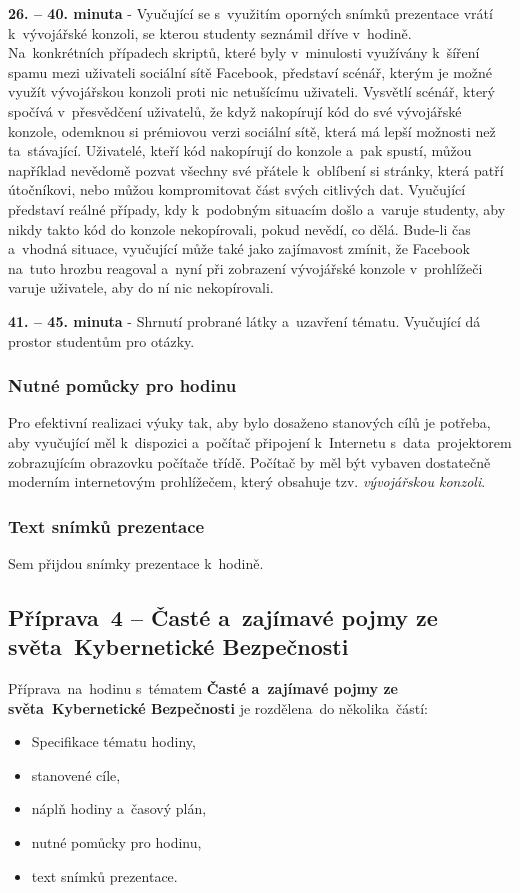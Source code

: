\documentclass[a4paper, 12pt]{article}
\begin{document}
\textbf{26. -- 40. minuta} - Vyučující se s~využitím oporných snímků prezentace vrátí k~vývojářské konzoli, se kterou studenty seznámil dříve v~hodině. Na~konkrétních případech skriptů, které byly v~minulosti využívány k~šíření spamu mezi uživateli sociální sítě Facebook, představí scénář, kterým je možné využít vývojářskou konzoli proti nic netušícímu uživateli. Vysvětlí scénář, který spočívá v~přesvědčení uživatelů, že když nakopírují kód do své vývojářské konzole, odemknou si prémiovou verzi sociální sítě, která má lepší možnosti než ta~stávající. Uživatelé, kteří kód nakopírují do konzole a~pak spustí, můžou například nevědomě pozvat všechny své přátele k~oblíbení si stránky, která patří útočníkovi, nebo můžou kompromitovat část svých citlivých dat. Vyučující představí reálné případy, kdy k~podobným situacím došlo a~varuje studenty, aby nikdy takto kód do konzole nekopírovali, pokud nevědí, co dělá. Bude-li čas a~vhodná situace, vyučující může také jako zajímavost zmínit, že Facebook na~tuto hrozbu reagoval a~nyní při zobrazení vývojářské konzole v~prohlížeči varuje uživatele, aby do ní nic nekopírovali.

\textbf{41. -- 45. minuta} - Shrnutí probrané látky a~uzavření tématu. Vyučující dá prostor studentům pro otázky.

\subsubsection{Nutné pomůcky pro hodinu}
Pro efektivní realizaci výuky tak, aby bylo dosaženo stanových cílů je potřeba, aby vyučující měl k~dispozici a~počítač připojení k~Internetu s~data~projektorem zobrazujícím obrazovku počítače třídě. Počítač by měl být vybaven dostatečně moderním internetovým prohlížečem, který obsahuje tzv. \textit{vývojářskou konzoli}.

\subsubsection{Text snímků prezentace}
Sem přijdou snímky prezentace k~hodině.


\subsection{Příprava~4 -- Časté a~zajímavé pojmy ze světa~Kybernetické Bezpečnosti}
Příprava~na~hodinu s~tématem \textbf{Časté a~zajímavé pojmy ze světa~Kybernetické Bezpečnosti} je rozdělena~do několika~částí:
\begin{itemize}
        \setlength{\itemsep}{-3pt}
        \item Specifikace tématu hodiny,
        \item stanovené cíle,
        \item náplň hodiny a~časový plán,
        \item nutné pomůcky pro hodinu,
        \item text snímků prezentace.
\end{itemize}
\end{document}
